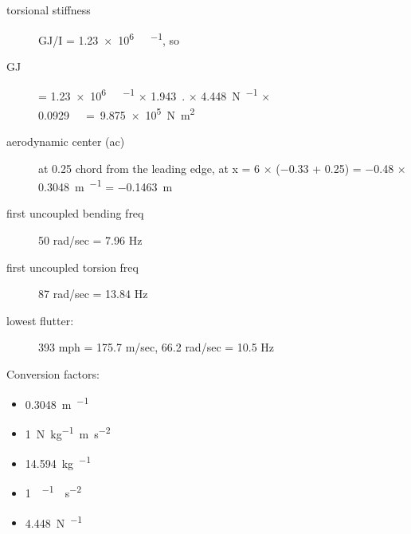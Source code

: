 \documentclass[11pt,openany,twoside]{book}
\numberwithin{equation}{section}		%
\let\US\SI
\begin{document}
\begin{description}
\item[torsional stiffness] GJ/I = \US{1.23e+6}{\lb.\ft\per\slug}, so
\item[GJ] = \qty[per-mode = symbol]{1.23e+6}{\lb.\ft\per\slug}
		$\times$ \qty[per-mode=symbol]{1.943}{\slug.\square\ft\per\ft}
		$\times$ \qty[per-mode=symbol]{4.448}{\N\per\lb}
		$\times$ \qty[per-mode=symbol]{0.0929}{\square\m\per\square\ft}
	\newline = \SI{9.875e+5}{\N\square\m}

\item[aerodynamic center (ac)] at 0.25 chord from the leading edge,
	at x = 6 $\times$ (\qty{-0.33}{\ft} + \qty{0.25}{\ft})
	= \qty{-0.48}{\ft} $\times$ \qty[per-mode=symbol]{0.3048}{\m\per\ft}
	= \qty{-0.1463}{\meter}

\item[first uncoupled bending freq] 50 rad/sec = 7.96 Hz

\item[first uncoupled torsion freq] 87 rad/sec = 13.84 Hz
\item[lowest flutter:] 393 mph = 175.7 m/sec, 66.2 rad/sec = 10.5 Hz
\end{description}
\par
Conversion factors:
\begin{itemize}
	\item \qty[per-mode=symbol]{0.3048}{\meter\per\ft}
	\item \SI{1}{N\per\kilogram\m\per\square\s}
	\item \SI{14.594}{\kilogram\per\slug}
	\item \US{1}{\lbf\per\slug\ft\per\square\s}
	\item \SI{4.448}{\N\per\lbf}
\end{itemize}
\end{document}
